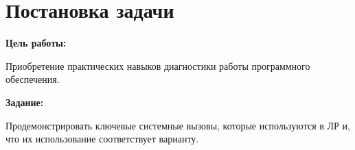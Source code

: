 \section{Постановка задачи}

{\bfseries Цель работы:} 

Приобретение практических навыков диагностики работы программного обеспечения.

{\bfseries Задание:} 

Продемонстрировать ключевые системные вызовы, которые используются в ЛР и, что их использование соответствует варианту.

\pagebreak
